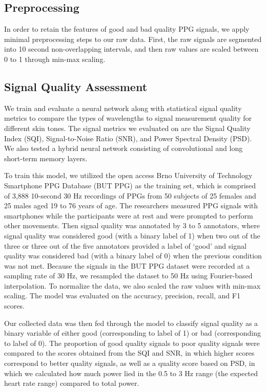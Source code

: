 \documentclass[letterpaper, 10 pt, conference]{ieeeconf}  %
\begin{document}
\subsection{Preprocessing}
In order to retain the features of good and bad quality PPG signals, we apply minimal preprocessing steps to our raw data. First, the raw signals are segmented into 10 second non-overlapping intervals, and then raw values are scaled between 0 to 1 through min-max scaling. 

\subsection{Signal Quality Assessment}
We train and evaluate a neural network along with statistical signal quality metrics to compare the types of wavelengths to signal measurement quality for different skin tones. The signal metrics we evaluated on are the Signal Quality Index (SQI), Signal-to-Noise Ratio (SNR), and Power Spectral Density (PSD). We also tested a hybrid neural network consisting of convolutional and long short-term memory layers. 

To train this model, we utilized the open access Brno University of Technology Smartphone PPG Database (BUT PPG) \cite{nemcova_brno_2021}\cite{nemcova_brno_nodate} as the training set, which is comprised of 3,888 10-second 30 Hz recordings of PPGs from 50 subjects of 25 females and 25 males aged 19 to 76 years of age. The researchers measured PPG signals with smartphones while the participants were at rest and were prompted to perform other movements. Then signal quality was annotated by 3 to 5 annotators, where signal quality was considered good (with a binary label of 1) when two out of the three or three out of the five annotators provided a label of ‘good’ and signal quality was considered bad (with a binary label of 0) when the previous condition was not met. Because the signals in the BUT PPG dataset were recorded at a sampling rate of 30 Hz, we resampled the dataset to 50 Hz using Fourier-based interpolation. To normalize the data, we also scaled the raw values with min-max scaling. The model was evaluated on the accuracy, precision, recall, and F1 scores.

Our collected data was then fed through the model to classify signal quality as a binary variable of either good (corresponding to label of 1) or bad (corresponding to label of 0). The proportion of good quality signals to poor quality signals were compared to the scores obtained from the SQI and SNR, in which higher scores correspond to better quality signals, as well as a quality score based on PSD, in which we calculated how much power lied in the 0.5 to 3 Hz range (the expected heart rate range) compared to total power. 
\end{document}
